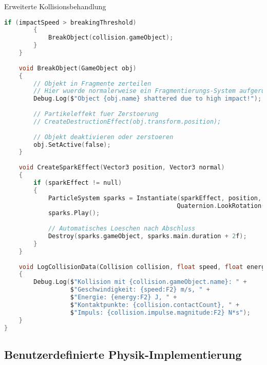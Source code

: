 \begin{code}{Erweiterte Kollisionsbehandlung}
\begin{lstlisting}[language=C, style=basesmol]
        if (impactSpeed > breakingThreshold) 
        {
            BreakObject(collision.gameObject);
        }
    }
    
    void BreakObject(GameObject obj) 
    {
        // Objekt in Fragmente zerteilen
        // Hier wuerde normalerweise ein Fragmentierungs-System aufgerufen
        Debug.Log($"Object {obj.name} shattered due to high impact!");
        
        // Partikeleffekt fuer Zerstoerung
        // CreateDestructionEffect(obj.transform.position);
        
        // Objekt deaktivieren oder zerstoeren
        obj.SetActive(false);
    }
    
    void CreateSparkEffect(Vector3 position, Vector3 normal) 
    {
        if (sparkEffect != null) 
        {
            ParticleSystem sparks = Instantiate(sparkEffect, position, 
                                               Quaternion.LookRotation(normal));
            sparks.Play();
            
            // Automatisches Loeschen nach Abschluss
            Destroy(sparks.gameObject, sparks.main.duration + 2f);
        }
    }
    
    void LogCollisionData(Collision collision, float speed, float energy) 
    {
        Debug.Log($"Kollision mit {collision.gameObject.name}: " +
                  $"Geschwindigkeit: {speed:F2} m/s, " +
                  $"Energie: {energy:F2} J, " +
                  $"Kontaktpunkte: {collision.contactCount}, " +
                  $"Impuls: {collision.impulse.magnitude:F2} N*s");
    }
}
\end{lstlisting}
\end{code}

\subsection{Benutzerdefinierte Physik-Implementierung}

